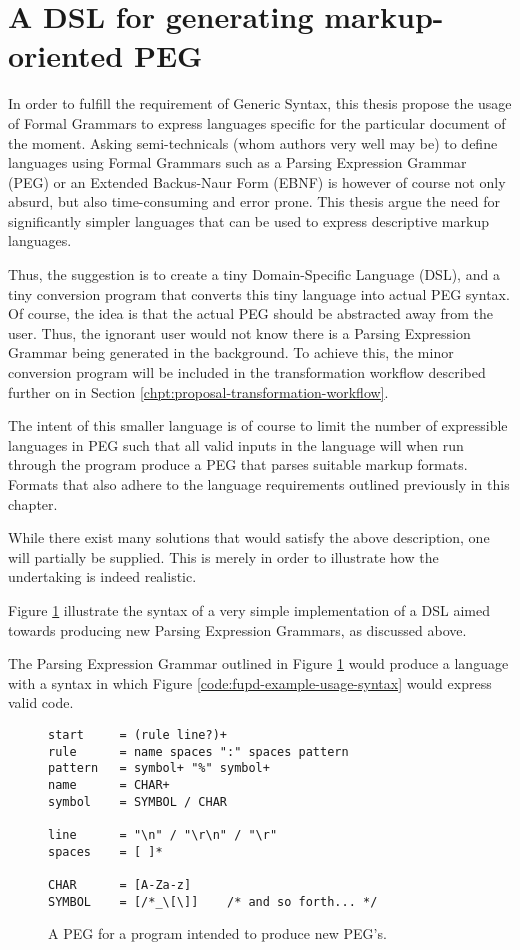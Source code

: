 \documentclass{scrreprt}
\begin{document}
\section{A DSL for generating markup-oriented PEG}
In order to fulfill the requirement of Generic Syntax, this thesis propose the usage of Formal Grammars to express languages specific for the particular document of the moment. Asking semi-technicals (whom authors very well may be) to define languages using Formal Grammars such as a Parsing Expression Grammar (PEG) or an Extended Backus-Naur Form (EBNF) is however of course not only absurd, but also time-consuming and error prone. This thesis argue the need for significantly simpler languages that can be used to express descriptive markup languages.


Thus, the suggestion is to create a tiny Domain-Specific Language (DSL), and a tiny conversion program that converts this tiny language into actual PEG syntax. Of course, the idea is that the actual PEG should be abstracted away from the user. Thus, the ignorant user would not know there is a Parsing Expression Grammar being generated in the background. To achieve this, the minor conversion program will be included in the transformation workflow described further on in Section \ref{chpt:proposal-transformation-workflow}. 

The intent of this smaller language is of course to limit the number of expressible languages in PEG such that all valid inputs in the language will when run through the program produce a PEG that parses suitable markup formats. Formats that also adhere to the language requirements outlined previously in this chapter.

While there exist many solutions that would satisfy the above description, one will partially be supplied. This is merely in order to illustrate how the undertaking is indeed realistic.

Figure \ref{code:fupd-peg} illustrate the syntax of a very simple implementation of a DSL aimed towards producing new Parsing Expression Grammars, as discussed above.

The Parsing Expression Grammar outlined in Figure \ref{code:fupd-peg} would produce a language with a syntax in which Figure \ref{code:fupd-example-usage-syntax} would express valid code.


\begin{figure}[h]
\begin{lstlisting}
start     = (rule line?)+
rule      = name spaces ":" spaces pattern
pattern   = symbol+ "%" symbol+
name      = CHAR+
symbol    = SYMBOL / CHAR

line      = "\n" / "\r\n" / "\r"
spaces    = [ ]*

CHAR      = [A-Za-z]
SYMBOL    = [/*_\[\]]    /* and so forth... */
\end{lstlisting}
\caption{A PEG for a program intended to produce new PEG's.}
\label{code:fupd-peg}
\end{figure}
\end{document}
